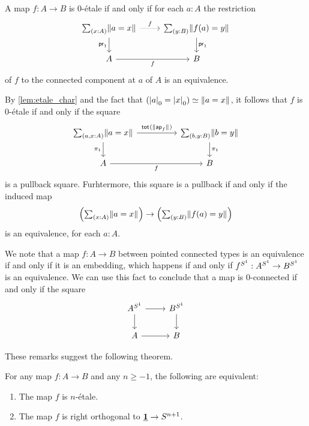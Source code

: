 \documentclass[9pt,twosided]{amsart}
\begin{document}
\begin{rmk}
A map $f:A\to B$ is $0$-\'etale if and only if for each $a:A$ the restriction
\begin{equation*}
\begin{tikzcd}
\sm{x:A}\brck{a=x} \arrow[d,swap,"\proj 1"] \arrow[r,densely dotted,"f"] & \sm{y:B}\brck{f(a)=y} \arrow[d,"\proj 1"] \\
A \arrow[r,swap,"f"] & B
\end{tikzcd}
\end{equation*}
of $f$ to the connected component at $a$ of $A$ is an equivalence.

By \cref{lem:etale_char} and the fact that $\eqv{(\tproj{0}{a}=\tproj{0}{x})}{\brck{a=x}}$, it follows that $f$ is $0$-\'etale if and only if the square
\begin{equation*}
\begin{tikzcd}[column sep=huge]
\sm{a,x:A}\brck{a=x} \arrow[d,swap,"\pi_1"] \arrow[r,"\total{\brck{\apfunc{f}}}"] & \sm{b,y:B}\brck{b=y} \arrow[d,"\pi_1"] \\
A \arrow[r,swap,"f"] & B
\end{tikzcd}
\end{equation*}
is a pullback square. Furhtermore, this square is a pullback if and only if the induced map
\begin{equation*}
\Big(\sm{x:A}\brck{a=x}\Big)\to\Big(\sm{y:B}\brck{f(a)=y}\Big)
\end{equation*}
is an equivalence, for each $a:A$.

We note that a map $f:A\to B$ between pointed connected types is an equivalence if and only if it is an embedding, which happens if and only if $f^{S^{1}}:A^{S^{1}} \to B^{S^{1}}$ is an equivalence. We can use this fact to conclude that a map is $0$-connected if and only if the square
    \begin{equation*}
      \begin{tikzcd}
        A^{\sphere{1}} \arrow[r] \arrow[d] & B^{\sphere{1}} \arrow[d] \\
        A \arrow[r] & B
      \end{tikzcd}
    \end{equation*}
\end{rmk}

These remarks suggest the following theorem.

\begin{thm}
  For any map $f:A\to B$ and any $n\geq -1$, the following are equivalent:
  \begin{enumerate}
  \item The map $f$ is $n$-\'etale.
  \item The map $f$ is right orthogonal to $\underline{\mathbf{1}}\to S^{n+1}$.
  \end{enumerate}
\end{thm}
\end{document}
